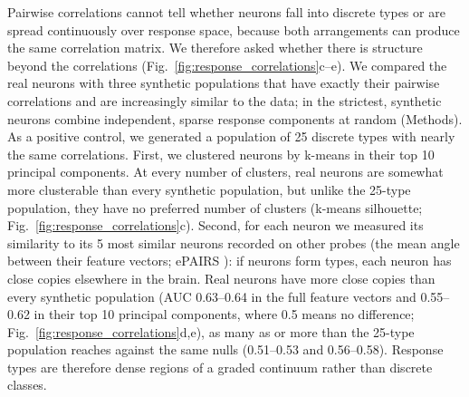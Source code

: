 \documentclass[10pt,lineno]{elife}
\begin{document}
Pairwise correlations cannot tell whether neurons fall into discrete types or are spread continuously over response space, because both arrangements can produce the same correlation matrix. We therefore asked whether there is structure beyond the correlations (Fig.~\ref{fig:response_correlations}c--e). We compared the real neurons with three synthetic populations that have exactly their pairwise correlations and are increasingly similar to the data; in the strictest, synthetic neurons combine independent, sparse response components at random (Methods). As a positive control, we generated a population of 25 discrete types with nearly the same correlations. First, we clustered neurons by k-means in their top 10 principal components. At every number of clusters, real neurons are somewhat more clusterable than every synthetic population, but unlike the 25-type population, they have no preferred number of clusters (k-means silhouette; Fig.~\ref{fig:response_correlations}c). Second, for each neuron we measured its similarity to its 5 most similar neurons recorded on other probes (the mean angle between their feature vectors; ePAIRS \cite{raposo2014category,hirokawa2019frontal}): if neurons form types, each neuron has close copies elsewhere in the brain. Real neurons have more close copies than every synthetic population (AUC 0.63--0.64 in the full feature vectors and 0.55--0.62 in their top 10 principal components, where 0.5 means no difference; Fig.~\ref{fig:response_correlations}d,e), as many as or more than the 25-type population reaches against the same nulls (0.51--0.53 and 0.56--0.58). Response types are therefore dense regions of a graded continuum rather than discrete classes.
\end{document}
